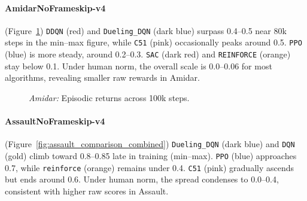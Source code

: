 \paragraph{AmidarNoFrameskip-v4}
(Figure~\ref{fig:amidar_comparison_combined})
\texttt{DDQN} (red) and \texttt{Dueling\_DQN} (dark blue) surpass 0.4--0.5 near 80k steps 
in the min--max figure, while \texttt{C51} (pink) occasionally peaks around 0.5. 
\texttt{PPO} (blue) is more steady, around 0.2--0.3. \texttt{SAC} (dark red) 
and \texttt{REINFORCE} (orange) stay below 0.1. 
Under human norm, the overall scale is 0.0--0.06 for most algorithms, 
revealing smaller raw rewards in Amidar.

\begin{figure} 
	\centering
	\quad
	\caption{\emph{Amidar:} Episodic returns across 100k steps.}
	\label{fig:amidar_comparison_combined}
\end{figure}

\paragraph{AssaultNoFrameskip-v4}
(Figure~\ref{fig:assault_comparison_combined})
\texttt{Dueling\_DQN} (dark blue) and \texttt{DQN} (gold) climb toward 0.8--0.85 
late in training (min--max). 
\texttt{PPO} (blue) approaches 0.7, while \texttt{reinforce} (orange) remains 
under 0.4. \texttt{C51} (pink) gradually ascends but ends around 0.6. 
Under human norm, the spread condenses to 0.0--0.4, consistent with higher 
raw scores in Assault.

